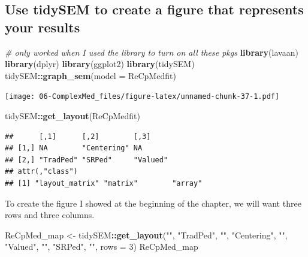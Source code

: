 \documentclass[
  11pt,
]{book}
\newenvironment{Shaded}{\begin{snugshade}}{\end{snugshade}}
\newcommand{\AttributeTok}[1]{\textcolor[rgb]{0.27,0.27,0.27}{#1}}
\newcommand{\CommentTok}[1]{\textcolor[rgb]{0.37,0.37,0.37}{\textit{#1}}}
\newcommand{\DecValTok}[1]{\textcolor[rgb]{0.06,0.06,0.06}{#1}}
\newcommand{\FunctionTok}[1]{\textcolor[rgb]{0.27,0.27,0.27}{\textbf{#1}}}
\newcommand{\NormalTok}[1]{#1}
\newcommand{\OtherTok}[1]{\textcolor[rgb]{0.37,0.37,0.37}{#1}}
\newcommand{\SpecialCharTok}[1]{\textcolor[rgb]{0.43,0.43,0.43}{\textbf{#1}}}
\newcommand{\StringTok}[1]{\textcolor[rgb]{0.5,0.5,0.5}{#1}}
\begin{document}
\hypertarget{use-tidysem-to-create-a-figure-that-represents-your-results-1}{%
\subsection*{Use tidySEM to create a figure that represents your results}\label{use-tidysem-to-create-a-figure-that-represents-your-results-1}}


\begin{Shaded}
\begin{Highlighting}[]
\CommentTok{\# only worked when I used the library to turn on all these pkgs}
\FunctionTok{library}\NormalTok{(lavaan)}
\FunctionTok{library}\NormalTok{(dplyr)}
\FunctionTok{library}\NormalTok{(ggplot2)}
\FunctionTok{library}\NormalTok{(tidySEM)}
\NormalTok{tidySEM}\SpecialCharTok{::}\FunctionTok{graph\_sem}\NormalTok{(}\AttributeTok{model =}\NormalTok{ ReCpMedfit)}
\end{Highlighting}
\end{Shaded}

\texttt{[image: 06-ComplexMed\_files/figure-latex/unnamed-chunk-37-1.pdf]}

\begin{Shaded}
\begin{Highlighting}[]
\NormalTok{tidySEM}\SpecialCharTok{::}\FunctionTok{get\_layout}\NormalTok{(ReCpMedfit)}
\end{Highlighting}
\end{Shaded}

\begin{verbatim}
##      [,1]      [,2]        [,3]    
## [1,] NA        "Centering" NA      
## [2,] "TradPed" "SRPed"     "Valued"
## attr(,"class")
## [1] "layout_matrix" "matrix"        "array"
\end{verbatim}

To create the figure I showed at the beginning of the chapter, we will want three rows and three columns.

\begin{Shaded}
\begin{Highlighting}[]
\NormalTok{ReCpMed\_map }\OtherTok{\textless{}{-}}\NormalTok{ tidySEM}\SpecialCharTok{::}\FunctionTok{get\_layout}\NormalTok{(}\StringTok{""}\NormalTok{, }\StringTok{"TradPed"}\NormalTok{, }\StringTok{""}\NormalTok{, }\StringTok{"Centering"}\NormalTok{, }\StringTok{""}\NormalTok{,}
    \StringTok{"Valued"}\NormalTok{, }\StringTok{""}\NormalTok{, }\StringTok{"SRPed"}\NormalTok{, }\StringTok{""}\NormalTok{, }\AttributeTok{rows =} \DecValTok{3}\NormalTok{)}
\NormalTok{ReCpMed\_map}
\end{Highlighting}
\end{Shaded}
\end{document}
